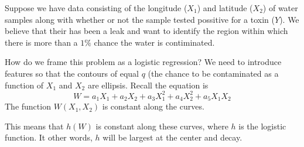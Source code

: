 \begin{exercise}

Suppose we have data consisting of the longitude ($X_1$) and latitude ($X_2$) of water samples along with whether or not the sample tested possitive for a toxin ($Y$). We believe that their has been a leak and want to identify the region within which there is more than a $1\%$ chance the water is contiminated.

How do we frame this problem as a logistic regression? We need to introduce features so that the contours of equal $q$ (the chance to be contaminated as a function of $X_1$ and $X_2$ are ellipsis. Recall the equation is
\begin{equation}
W = a_1X_1 + a_2X_2 + a_3X_1^2 + a_4X_2^2 + a_5X_1X_2
\end{equation}
The function $W(X_1,X_2)$ is constant along the curves.

This means that $h(W)$ is constant along these curves, where $h$ is the logistic function. It other words, $h$ will be largest at the center and decay.


\end{exercise}






